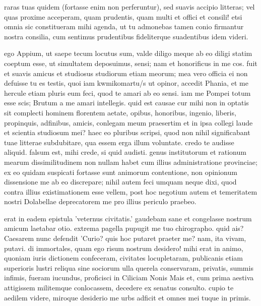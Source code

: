 


 raras tuas quidem (fortasse enim non perferuntur), sed suavis accipio litteras; vel quas proxime acceperam, quam prudentis, quam multi et offici et consili! etsi omnia sic constitueram mihi agenda, ut tu admonebas tamen conio firmantur nostra consilia, cum sentimus prudentibus fideliterque suadentibus idem videri.

 ego Appium, ut saepe tecum locutus sum, valde diligo meque ab eo diligi statim coeptum esse, ut simultatem deposuimus, sensi; nam et honorificus in me cos. fuit et suavis amicus et studiosus studiorum etiam meorum; mea vero officia ei non defuisse tu es testis, quoi iam kwmiko\s martu/s ut opinor, accedit Phania, et me hercule etiam pluris eum feci, quod te amari ab eo sensi. iam me Pompei totum esse scis; Brutum a me amari intellegis. quid est causae cur mihi non in optatis sit complecti hominem florentem aetate, opibus, honoribus, ingenio, liberis, propinquis, adfinibus, amicis, conlegam meum praesertim et in ipsa collegi laude et scientia studiosum mei? haec eo pluribus scripsi, quod non nihil significabant tuae litterae subdubitare, qua essem erga illum voluntate. credo te audisse aliquid. falsum est, mihi crede, si quid audisti. genus institutorum et rationum mearum dissimilitudinem non nullam habet cum illius administratione provinciae; ex eo quidam suspicati fortasse sunt animorum contentione, non opinionum dissensione me ab eo discrepare; nihil autem feci umquam neque dixi, quod contra illius existimationem esse vellem, post hoc negotium autem et temeritatem nostri Dolabellae deprecatorem me pro illius periculo praebeo.

 erat in eadem epistula 'veternus civitatis.' gaudebam sane et congelasse nostrum amicum laetabar otio. extrema pagella pupugit me tuo chirographo. quid ais? Caesarem nunc defendit 'Curio? quis hoc putaret praeter me? nam, ita vivam, putavi. di immortales, quam ego risum nostrum desidero! mihi erat in animo, quoniam iuris dictionem confeceram, civitates locupletaram, publicanis etiam superioris lustri reliqua sine sociorum ulla querela conservaram, privatis, summis infimis, fueram iucundus, proficisci in Ciliciam Nonis Mais et, cum prima aestiva attigissem militemque conlocassem, decedere ex senatus consulto. cupio te aedilem videre, miroque desiderio me urbs adficit et omnes mei tuque in primis.
